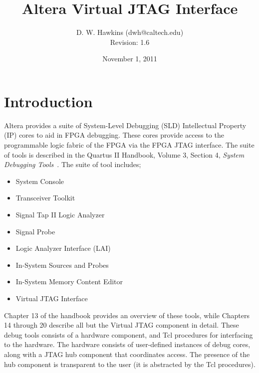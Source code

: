 \documentclass[10pt,twoside]{article}
\begin{document}
\title{Altera Virtual JTAG Interface}
\author{D. W. Hawkins (dwh@caltech.edu)\\
        Revision: 1.6}
\date{November 1, 2011}
\maketitle

\thispagestyle{empty}

\tableofcontents

\cleardoublepage

\pagestyle{fancy}
\chead{}
\rhead{\today}
\lfoot{}
\cfoot{}
\rfoot{\thepage}
\renewcommand{\headrulewidth}{0.4pt}
\renewcommand{\footrulewidth}{0.4pt}

\lstset{language=Tcl}

\section{Introduction}

Altera provides a suite of System-Level Debugging (SLD) 
Intellectual Property (IP) cores to aid in FPGA debugging.
These cores provide access to the programmable logic fabric
of the FPGA via the FPGA JTAG interface.
The suite of tools is described in the Quartus II Handbook,
Volume 3, Section 4, {\em System Debugging 
Tools}~\cite{Altera_Quartus_Handbook_2010}.
The suite of tool includes;
%
\begin{itemize}
\item System Console
\item Transceiver Toolkit
\item Signal Tap II Logic Analyzer
\item Signal Probe
\item Logic Analyzer Interface (LAI)
\item In-System Sources and Probes
\item In-System Memory Content Editor
\item Virtual JTAG Interface
\end{itemize}
%
Chapter 13 of the handbook provides an overview of
these tools, while Chapters 14 through 20 describe all but
the Virtual JTAG component in detail.
These debug tools consists of a hardware component, and
Tcl procedures for interfacing to the hardware. 
The hardware consists of user-defined instances of
debug cores, along with a JTAG hub component that 
coordinates access. The presence of the hub component 
is transparent to the user (it is abstracted by the Tcl
procedures).
\end{document}
